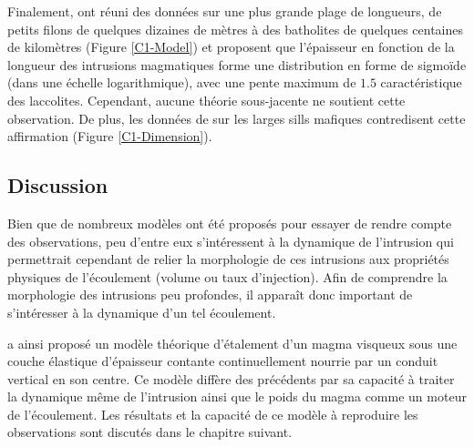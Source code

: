 Finalement, \citet{Nachwuchskoechin:2002tv} ont  réuni des données sur
une  plus grande  plage de  longueurs,  de petits  filons de  quelques
dizaines  de  mètres  à  des   batholites  de  quelques  centaines  de
kilomètres  (Figure \ref{C1-Model})  et proposent  que l'épaisseur  en
fonction  de   la  longueur  des  intrusions   magmatiques  forme  une
distribution en  forme de  sigmoïde (dans une  échelle logarithmique),
avec  une  pente  maximum  de $1.5$  caractéristique  des  laccolites.
Cependant, aucune théorie sous-jacente  ne soutient cette observation.
De  plus,  les  données  de \citet{Cruden:tg}  sur  les  larges  sills
mafiques contredisent cette affirmation (Figure \ref{C1-Dimension}).

\subsection{Discussion}
\label{C1-sec:conclusion}

Bien que de  nombreux modèles ont été proposés pour  essayer de rendre
compte des observations, peu d'entre  eux s'intéressent à la dynamique
de l'intrusion qui  permettrait cependant de relier  la morphologie de
ces  intrusions aux  propriétés physiques  de l'écoulement  (volume ou
taux d'injection).   Afin de comprendre la  morphologie des intrusions
peu  profondes,  il  apparaît  donc important  de  s'intéresser  à  la
dynamique d'un tel écoulement.

\citet{Michaut:2011kg} a ainsi proposé un modèle théorique d'étalement
d'un  magma visqueux  sous une  couche élastique  d'épaisseur contante
continuellement nourrie  par un  conduit vertical  en son  centre.  Ce
modèle diffère des  précédents par sa capacité à  traiter la dynamique
même de  l'intrusion ainsi que  le poids du  magma comme un  moteur de
l'écoulement. Les résultats  et la capacité de ce  modèle à reproduire
les observations sont discutés dans le chapitre suivant.

